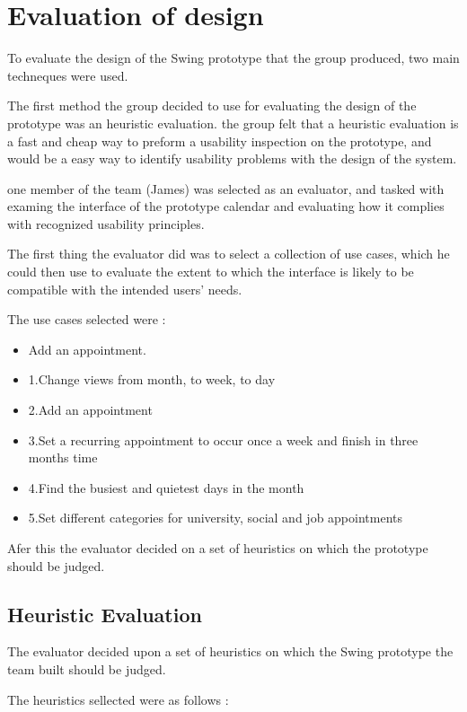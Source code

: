 \documentclass{article}
\begin{document}
\section{Evaluation of design}

To evaluate the design of the Swing prototype that the group produced, two main techneques were used.  

The first method the group decided to use for evaluating the design of the prototype was an heuristic evaluation. 
the group felt that a heuristic evaluation is a fast and cheap way to preform a usability inspection on the prototype, and would be a easy way to identify usability problems with the design of the system. 

one member of the team (James) was selected as an evaluator, and tasked with examing the interface of the prototype calendar and evaluating how it complies with recognized usability principles. 

The first thing the evaluator did was to select a collection of use cases, which he could then use to evaluate the extent to which the interface is likely to be compatible with the intended users’ needs. 

The use cases selected were : 
\begin{itemize}
\item Add an appointment.

\item 1.Change views from month, to week, to day 
\item 2.Add an appointment 
\item 3.Set a recurring appointment to occur once a week and finish in three months time
\item 4.Find the busiest and quietest days in the month
\item 5.Set different categories for university, social and job appointments
\end{itemize}

Afer this the evaluator decided on a set of heuristics on which the prototype should be judged. 

\subsection{Heuristic Evaluation}

The evaluator decided upon a set of heuristics on which the Swing prototype the team built should be judged.

The heuristics sellected were as follows : 
\end{document}
